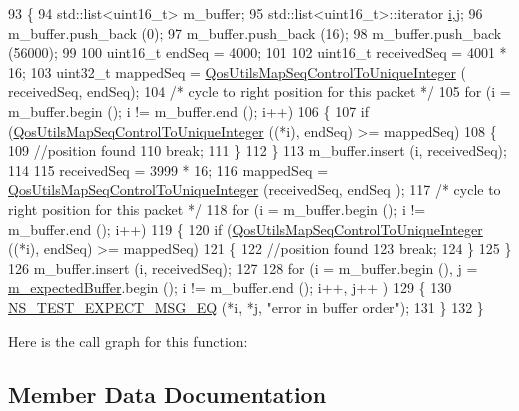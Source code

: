 \begin{DoxyCode}
93 \{
94   std::list<uint16\_t> m\_buffer;
95   std::list<uint16\_t>::iterator \hyperlink{bernuolliDistribution_8m_a6f6ccfcf58b31cb6412107d9d5281426}{i},j;
96   m\_buffer.push\_back (0);
97   m\_buffer.push\_back (16);
98   m\_buffer.push\_back (56000);
99 
100   uint16\_t endSeq = 4000;
101 
102   uint16\_t receivedSeq = 4001 * 16;
103   uint32\_t mappedSeq = \hyperlink{group__wifi_ga841296fae895cac77a0e14183b8134e0}{QosUtilsMapSeqControlToUniqueInteger} (
      receivedSeq, endSeq);
104   \textcolor{comment}{/* cycle to right position for this packet */}
105   \textcolor{keywordflow}{for} (i = m\_buffer.begin (); i != m\_buffer.end (); i++)
106     \{
107       \textcolor{keywordflow}{if} (\hyperlink{group__wifi_ga841296fae895cac77a0e14183b8134e0}{QosUtilsMapSeqControlToUniqueInteger} ((*i), endSeq) >= 
      mappedSeq)
108         \{
109           \textcolor{comment}{//position found}
110           \textcolor{keywordflow}{break};
111         \}
112     \}
113   m\_buffer.insert (i, receivedSeq);
114 
115   receivedSeq = 3999 * 16;
116   mappedSeq = \hyperlink{group__wifi_ga841296fae895cac77a0e14183b8134e0}{QosUtilsMapSeqControlToUniqueInteger} (receivedSeq, endSeq
      );
117   \textcolor{comment}{/* cycle to right position for this packet */}
118   \textcolor{keywordflow}{for} (i = m\_buffer.begin (); i != m\_buffer.end (); i++)
119     \{
120       \textcolor{keywordflow}{if} (\hyperlink{group__wifi_ga841296fae895cac77a0e14183b8134e0}{QosUtilsMapSeqControlToUniqueInteger} ((*i), endSeq) >= 
      mappedSeq)
121         \{
122           \textcolor{comment}{//position found}
123           \textcolor{keywordflow}{break};
124         \}
125     \}
126   m\_buffer.insert (i, receivedSeq);
127 
128   \textcolor{keywordflow}{for} (i = m\_buffer.begin (), j = \hyperlink{classPacketBufferingCaseA_a9984383a1d31e0e704c530dfdd28e2d6}{m\_expectedBuffer}.begin (); i != m\_buffer.end (); i++, j++
      )
129     \{
130       \hyperlink{group__testing_ga7304ba46a28d8cf08dfdfd6499cf7068}{NS\_TEST\_EXPECT\_MSG\_EQ} (*i, *j, \textcolor{stringliteral}{"error in buffer order"});
131     \}
132 \}
\end{DoxyCode}


Here is the call graph for this function\+:




\subsection{Member Data Documentation}
